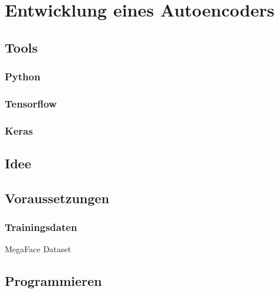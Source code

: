 \documentclass[../main]{subfiles}
\begin{document}
\section{Entwicklung eines Autoencoders}
\subsection{Tools}
\subsubsection{Python}
\subsubsection{Tensorflow}
\subsubsection{Keras}
\subsection{Idee}
\subsection{Voraussetzungen}
\subsubsection{Trainingsdaten}
MegaFace Dataset
\subsection{Programmieren}
\end{document}
